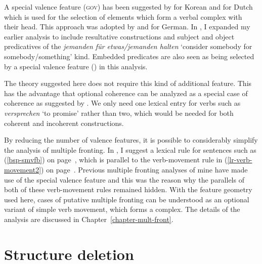 \begin{exe}
\begin{xlist}
A special valence feature (\textsc{gov}) has been suggested by \citet*{Chung93a} for Korean and
\citet*{Rentier94} for Dutch which is used for the selection of elements which form a 
verbal complex with their head. This approach was adopted by \citet{Kathol98b,Kathol2000a} and \citet{Mueller97c,Mueller99a}
for German. In , I expanded my earlier analysis to include resultative
constructions and subject and object predicatives of the \emph{jemanden für etwas/jemanden halten} `consider somebody for somebody/something' kind. 
Embedded predicates are also seen as being selected by a special valence feature (\vcomp) in this analysis.


The theory suggested here does not require this kind of additional feature. This has the advantage
that optional coherence can be analyzed as a special case of coherence as suggested by \citet{Kiss95a}.
We only need one lexical entry for verbs such as \emph{versprechen} `to promise' rather than two, which would be
needed for both coherent and incoherent constructions. 

By reducing the number of valence features, it is possible to considerably simplify the
analysis of multiple fronting. In , I suggest a lexical rule for
sentences such as (\ref{bsp-smvfb}) on page~\pageref{bsp-smvfb}, which is parallel to the verb-movement
rule in (\ref{lr-verb-movement2}) on page~\pageref{lr-verb-movement2}. 
Previous multiple fronting analyses of mine \citep{Mueller2002f,Mueller2002c}
have made use of the special valence feature \vcomp and this was the reason why the parallels of both of these verb-movement rules
remained hidden. With the feature geometry used here, cases of putative multiple fronting can be understood as
an optional variant of simple verb movement, which forms a complex. The details of the analysis are
discussed in Chapter~\ref{chapter-mult-front}.


\section{Structure deletion}
\label{sec-freezing}


\end{xlist}
\end{exe}

